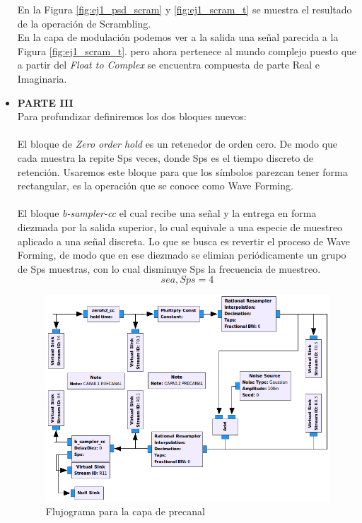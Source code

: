 \begin{itemize}
En la Figura \ref{fig:ej1_psd_scram} y \ref{fig:ej1_scram_t} se muestra el resultado de la operación de Scrambling.\\


En la capa de modulación podemos ver  a la salida una señal parecida a la Figura \ref{fig:ej1_scram_t}. pero ahora pertenece al mundo complejo puesto que a partir del \textit{Float to Complex} se encuentra compuesta de parte Real e Imaginaria. \\

\item \textbf{PARTE III}\\

Para profundizar definiremos los dos bloques nuevos:\\
\ \\ %
El bloque de \textit{Zero order hold} es un retenedor de orden cero. De modo que cada muestra la repite Sps veces, donde Sps es el tiempo discreto de retención. Usaremos este bloque para que los símbolos parezcan tener forma rectangular, es la operación que se conoce como Wave Forming. \\
\ \\ %
El bloque  \textit{b-sampler-cc} el cual recibe una señal y la entrega en forma diezmada por la salida superior, lo cual equivale a una especie de muestreo aplicado a una señal discreta. Lo que se busca es revertir el proceso de Wave Forming, de modo que en ese diezmado se elimian periódicamente un grupo de Sps muestras, con lo cual disminuye Sps la frecuencia de  muestreo.\\

\begin{equation} \label{capcuatro_sesentaynueve}
 sea, Sps=4
\end{equation}

\vspace{200px}
\begin{figure}[h!]
	\captionsetup{justification = raggedright, singlelinecheck = false}
    \caption{Flujograma para la capa de precanal}
    \label{fig:ej1_precanal_flujo}
    \includegraphics[width=0.7\linewidth]{Imagenes/r.png}
    \centering
\end{figure}


\end{itemize}
